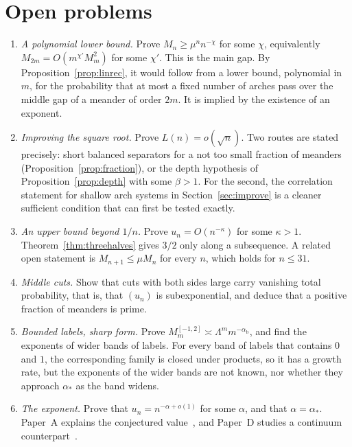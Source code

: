 \section{Open problems}\label{sec:open}

\begin{enumerate}
\item \emph{A polynomial lower bound.} Prove $M_n\ge\mu^nn^{-\chi}$ for some $\chi$, equivalently
$M_{2m}=O(m^{\chi'}M_m^2)$ for some $\chi'$. This is the main gap. By Proposition~\ref{prop:linrec}, it would follow from a
lower bound, polynomial in $m$, for the probability that at most a fixed number of arches pass over
the middle gap of a meander of order $2m$. It is implied by the existence of an exponent.
\item \emph{Improving the square root.} Prove $L(n)=o(\sqrt n)$. Two routes are stated precisely: short
balanced separators for a not too small fraction of meanders (Proposition~\ref{prop:fraction}), or
the depth hypothesis of Proposition~\ref{prop:depth} with some $\beta>1$. For the second, the
correlation statement for shallow arch systems in Section~\ref{sec:improve} is a cleaner sufficient
condition that can first be tested exactly.
\item \emph{An upper bound beyond $1/n$.} Prove $u_n=O(n^{-\kappa})$ for some $\kappa>1$. Theorem~\ref{thm:threehalves} gives $3/2$ only along a subsequence. A related open
statement is $M_{n+1}\le\mu M_n$ for every $n$, which holds for $n\le31$.
\item \emph{Middle cuts.} Show that cuts with both sides large carry vanishing total probability,
that is, that $(u_n)$ is subexponential, and deduce that a positive fraction of meanders is prime.
\item \emph{Bounded labels, sharp form.} Prove
$M^{[-1,2]}_m\asymp\Lambda^mm^{-\alpha_{\mathrm b}}$, and find the exponents of wider bands of
labels. For every band of labels that contains $0$ and $1$, the corresponding family is closed under
products, so it has a growth rate, but the exponents of the wider bands are not known, nor whether they approach $\alpha_*$ as the
band widens.
\item \emph{The exponent.} Prove that $u_n=n^{-\alpha+o(1)}$ for some $\alpha$, and that
$\alpha=\alpha_*$. Paper~A explains the conjectured value~\cite{PaperA}, and Paper~D studies a
continuum counterpart~\cite{PaperD}.
\end{enumerate}
